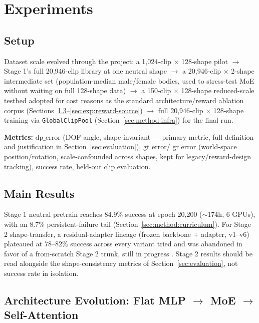 \section{Experiments}
\label{sec:experiments}

\subsection{Setup}
\label{sec:exp:setup}

Dataset scale evolved through the project: a 1{,}024-clip $\times$ 128-shape pilot $\to$ Stage 1's
full 20{,}946-clip library at one neutral shape $\to$ a 20{,}946-clip $\times$ 2-shape
intermediate set (population-median male/female bodies, used to stress-test MoE without waiting on
full 128-shape data) $\to$ a 150-clip $\times$ 128-shape reduced-scale testbed adopted for cost
reasons as the standard architecture/reward ablation corpus
(Sections~\ref{sec:exp:architecture}--\ref{sec:exp:reward-source}) $\to$ full
20{,}946-clip $\times$ 128-shape training via \texttt{GlobalClipPool}
(Section~\ref{sec:method:infra}) for the final run.

\textbf{Metrics:} $\mathrm{dp\_error}$ (DOF-angle, shape-invariant — primary metric, full
definition and justification in Section~\ref{sec:evaluation}), $\mathrm{gt\_error}$/
$\mathrm{gr\_error}$ (world-space position/rotation, scale-confounded across shapes, kept for
legacy/reward-design tracking), success rate, held-out clip evaluation.

\subsection{Main Results}
\label{sec:exp:main-results}

Stage 1 neutral pretrain reaches 84.9\% success at epoch 20{,}200 ($\sim$174h, 6 GPUs), with an
8.7\% persistent-failure tail (Section~\ref{sec:method:curriculum}). For Stage 2 shape-transfer,
a residual-adapter lineage (frozen backbone + adapter, v1--v6) plateaued at 78--82\% success
across every variant tried and was abandoned in favor of a from-scratch Stage 2 trunk, still in
progress . Stage 2 results should be read alongside the
shape-consistency metrics of Section~\ref{sec:evaluation}, not success rate in isolation.

\subsection{Architecture Evolution: Flat MLP $\to$ MoE $\to$ Self-Attention}
\label{sec:exp:architecture}

